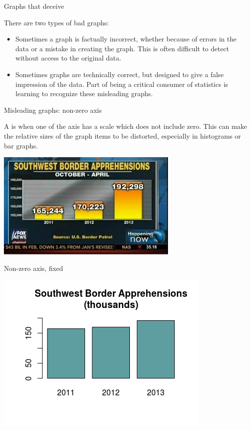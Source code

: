 \documentclass[xcolor=table, aspectratio=169, bigger, handout]{beamer}
\begin{document}
\begin{frame}{Graphs that deceive}
\begin{block}{}
There are two types of bad graphs:
\begin{itemize}
\item Sometimes a graph is factually incorrect, whether because of errors in the data or a mistake in creating the graph. This is often difficult to detect without access to the original data.
\item Sometimes graphs are technically correct, but designed to give a false impression of the data. Part of being a critical consumer of statistics is learning to recognize these misleading graphs.
\end{itemize}
\end{block}
\end{frame}

\begin{frame}{Misleading graphs: non-zero axis}
\begin{block}{}
A  is when one of the axis has a scale which does not include zero. This can make the relative sizes of the graph items to be distorted, especially in histograms or bar graphs.
\end{block}
\pause
\begin{center}
\includegraphics[width=3.5in]{../images/wk04_bad_nonzero}\par
\end{center}
\end{frame}

\begin{frame}{Non-zero axis, fixed}
\begin{center}
\includegraphics{../images/wk04_bad_nonzero_fixed} 
\end{center}
\end{frame}
\end{document}
